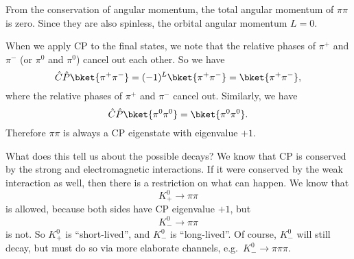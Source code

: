 \documentclass[a4paper]{article}
\begin{document}
\begin{center}
\end{center}
From the conservation of angular momentum, the total angular momentum of $\pi \pi$ is zero. Since they are also spinless, the orbital angular momentum $L = 0$.

When we apply CP to the final states, we note that the relative phases of $\pi^+$ and $\pi^-$ (or $\pi^0$ and $\pi^0$) cancel out each other. So we have
\[
  \hat{C}\hat{P} \bket{\pi^+\pi^-} = (-1)^L \bket{\pi^+\pi^-} = \bket{\pi^+ \pi^-},
\]
where the relative phases of $\pi^+$ and $\pi^-$ cancel out. Similarly, we have
\[
  \hat{C}\hat{P} \bket{\pi^0 \pi^0} = \bket{\pi^0 \pi^0}.
\]
Therefore $\pi \pi$ is always a CP eigenstate with eigenvalue $+1$.

What does this tell us about the possible decays? We know that CP is conserved by the strong and electromagnetic interactions. If it were conserved by the weak interaction as well, then there is a restriction on what can happen. We know that
\[
  K^0_+ \to \pi \pi
\]
is allowed, because both sides have CP eigenvalue $+1$, but
\[
  K^0_- \to \pi \pi
\]
is not. So $K^0_+$ is ``short-lived'', and $K^0_-$ is ``long-lived''. Of course, $K^0_-$ will still decay, but must do so via more elaborate channels, e.g.\ $K^0_- \to \pi \pi \pi$.
\end{document}
